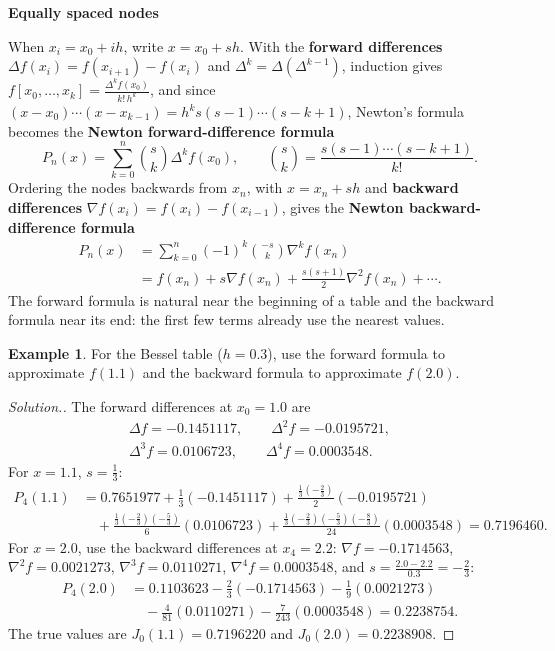 \documentclass[11pt,a4paper]{article}
\numberwithin{equation}{section}
\theoremstyle{definition}
\newtheorem{exa}[thm]{Example}
\newenvironment{solution}
  {\renewcommand{\qedsymbol}{}\begin{proof}[\textit{Solution}.]}
  {\end{proof}}
\newcommand{\subhead}[1]{%
  \par\medskip\noindent\textbf{#1}\par\nobreak\smallskip}
\begin{document}
\subhead{Equally spaced nodes}
When $x_i = x_0+ih$, write $x = x_0+sh$. With the \textbf{forward differences} $\Delta f(x_i) = f(x_{i+1})-f(x_i)$ and $\Delta^k = \Delta(\Delta^{k-1})$,
induction gives $f[x_0,\dots,x_k] = \frac{\Delta^kf(x_0)}{k!\,h^k}$, and since $(x-x_0)\cdots(x-x_{k-1}) = h^ks(s-1)\cdots(s-k+1)$, Newton's formula
becomes the \textbf{Newton forward-difference formula}
$$P_n(x) = \sum_{k=0}^n\binom{s}{k}\Delta^kf(x_0),\qquad\binom sk = \frac{s(s-1)\cdots(s-k+1)}{k!} .$$
Ordering the nodes backwards from $x_n$, with $x = x_n+sh$ and \textbf{backward differences} $\nabla f(x_i) = f(x_i)-f(x_{i-1})$, gives the
\textbf{Newton backward-difference formula}
\begin{align*}
P_n(x) &= \sum_{k=0}^n(-1)^k\binom{-s}{k}\nabla^kf(x_n)\\
&= f(x_n)+s\nabla f(x_n)+\frac{s(s+1)}{2}\nabla^2f(x_n)+\cdots .
\end{align*}
The forward formula is natural near the beginning of a table and the backward formula near its end: the first few terms already use the
nearest values.

\begin{exa}
\label{exa:fwdbwd}
For the Bessel table ($h = 0.3$), use the forward formula to approximate $f(1.1)$ and the backward formula to approximate $f(2.0)$.
\end{exa}

\begin{solution}
The forward differences at $x_0 = 1.0$ are
\begin{gather*}
\Delta f = -0.1451117,\qquad\Delta^2f = -0.0195721,\\
\Delta^3f = 0.0106723,\qquad\Delta^4f = 0.0003548 .
\end{gather*}
For $x = 1.1$, $s = \frac13$:
\begin{align*}
P_4(1.1) &= 0.7651977+\tfrac13(-0.1451117)+\tfrac{\frac13(-\frac23)}{2}(-0.0195721)\\
&\quad+\tfrac{\frac13(-\frac23)(-\frac53)}{6}(0.0106723)+\tfrac{\frac13(-\frac23)(-\frac53)(-\frac83)}{24}(0.0003548) = 0.7196460 .
\end{align*}
For $x = 2.0$, use the backward differences at $x_4 = 2.2$: $\nabla f = -0.1714563$, $\nabla^2f = 0.0021273$, $\nabla^3f = 0.0110271$,
$\nabla^4f = 0.0003548$, and $s = \frac{2.0-2.2}{0.3} = -\frac23$:
\begin{align*}
P_4(2.0) &= 0.1103623-\tfrac23(-0.1714563)-\tfrac19(0.0021273)\\
&\quad-\tfrac{4}{81}(0.0110271)-\tfrac{7}{243}(0.0003548) = 0.2238754 .
\end{align*}
The true values are $J_0(1.1) = 0.7196220$ and $J_0(2.0) = 0.2238908$.
\end{solution}
\end{document}
